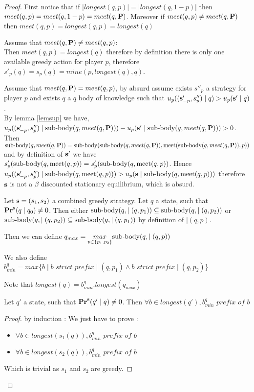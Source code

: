 \begin{proof}
First notice that if $|longest(q,p)| = |longest(q,1-p)|$ then $meet(q,p) = meet(q,1-p) = meet(q,\mathbf{P})$. Moreover if $meet(q,p) \neq meet(q,\mathbf{P})$ then $meet(q,p) = longest(q,p) = longest(q)$

Assume that $meet(q,\mathbf{P}) \neq meet(q,p)$:
\\Then $meet(q,p) = longest(q)$ therefore by definition there is only one available greedy action for player $p$, therefore $s'_p(q) = s_p(q) = mine(p,longest(q),q)$. 

Assume that $meet(q,\mathbf{P}) = meet(q,p)$,
by absurd assume exists $s''_p$ a strategy for player $p$ and exists $q$ a $q$ body of knowledge such that $u_p ((\mathbf{s}'_{-p},s''_p) \mid q) > u_p(\mathbf{s}' \mid q)$.
\\By lemma \ref{lemsup} we have, $u_p((\mathbf{s}'_{-p},s''_p) \mid {\text{\rm sub-body}}(q,meet(q,\mathbf{P}))) - u_p(\mathbf{s}' \mid {\text{\rm sub-body}}(q,meet(q,\mathbf{P}))) > 0$. 
\\Then ${\text{\rm sub-body}}(q,meet(q,\mathbf{P})) = {\text{\rm sub-body}}({\text{\rm sub-body}}(q,meet(q,\mathbf{P})),\text{\rm meet}({\text{\rm sub-body}}(q,meet(q,\mathbf{P})),p))$ and by definition of $\mathbf{s}'$ we have $s'_p({\text{\rm sub-body}}(q,\text{\rm meet}(q,p)) = s'_p({\text{\rm sub-body}}(q,\text{\rm meet}(q,p))$. Hence $u_p((\mathbf{s}'_{-p},s''_p) \mid {\text{\rm sub-body}}(q,\text{\rm meet}(q,p))) > u_p(\mathbf{s} \mid {\text{\rm sub-body}}(q,\text{\rm meet}(q,p)))$ therefore $\mathbf{s}$ is not a $\beta$ discounted stationary equilibrium, which is absurd.



	
\iffalse	
	Let $\mathbf{s} = (s_1,s_2)$ a combined greedy strategy. 
	Let $q$ a state, such that $\mathbf{Pr}^{\mathbf{s}}(q \mid q_0) \neq 0$. 
	Then either ${\text{\rm sub-body}}(q,\mid(q,p_1)) \subseteq {\text{\rm sub-body}}(q,\mid(q,p_2))$ or ${\text{\rm sub-body}}(q,\mid(q,p_2)) \subseteq {\text{\rm sub-body}}(q,\mid(q,p_1))$ by definition of $\mid(q,p)$.
	
	Then we  can define $q_{max} = \underset{p \in \{p_1,p_2\}}{max}{\text{\rm sub-body}}(q,\mid(q,p))$
	
	We also define $b^q_{min} = max\{b \mid b \textit{ strict prefix} \mid(q,p_1) \land b \textit{ strict prefix} \mid(q,p_2) \}$
	
	Note that $longest(q) = b^q_{min}.longest(q_{max})$
	
	\begin{mylem}
	Let $q'$ a state, such that $\mathbf{Pr}^{\mathbf{s}}(q' \mid q) \neq 0$. 
	Then  $\forall b \in longest(q'), b^q_{min} \textit{ prefix of } b$
	\end{mylem}
	\begin{proof}
		by induction : 
		We just have to prove : 
		\begin{itemize}
		\item $\forall b \in longest(s_1(q)), b^q_{min} \textit{ prefix of } b $
		\item $\forall b \in longest(s_2(q)), b^q_{min} \textit{ prefix of } b $
		\end{itemize}
	Which is trivial as $s_1$ and $s_2$ are greedy.
	\end{proof}


\end{proof}
